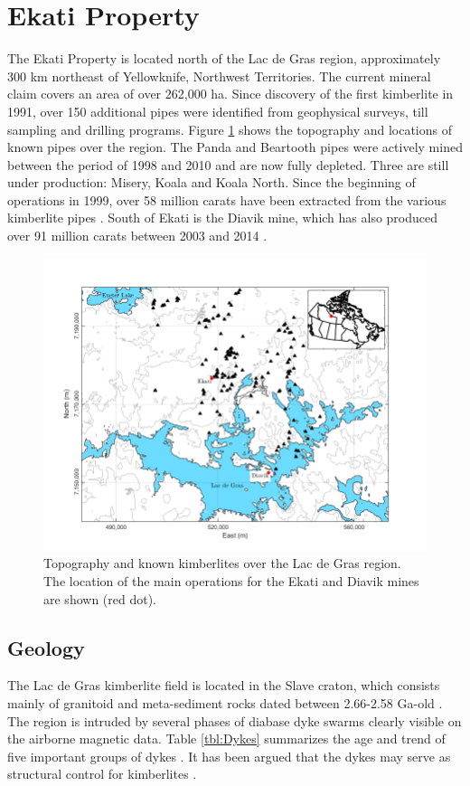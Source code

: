 \section{Ekati Property}
The Ekati Property is located north of the Lac de Gras region, approximately 300 km northeast of Yellowknife, Northwest Territories.
The current mineral claim covers an area of over 262,000 ha.
Since discovery of the first kimberlite in 1991, over 150 additional pipes were identified from geophysical surveys, till sampling and drilling programs.
Figure \ref{fig:Ekati_Location} shows the topography and locations of known pipes over the region.
The Panda and Beartooth pipes were actively mined between the period of 1998 and 2010 and are now fully depleted.
Three are still under production: Misery, Koala and Koala North.
Since the beginning of operations in 1999, over 58 million carats have been extracted from the various kimberlite pipes \cite[]{Carlson2015}.
South of Ekati is the Diavik mine, which has also produced over 91 million carats between 2003 and 2014 \cite[]{Yip2015}.

\begin{figure}[h!]
\includegraphics[scale=0.6]{Ekati_Location.png}
\caption{Topography and known kimberlites over the Lac de Gras region. The location of the main operations for the Ekati and Diavik mines are shown (red dot).}
\label{fig:Ekati_Location}
\end{figure}

\subsection{Geology}
The Lac de Gras kimberlite field is located in the Slave craton,  which consists mainly of granitoid and meta-sediment rocks dated between 2.66-2.58 Ga-old \cite[]{Creaser2004}.
The region is intruded by several phases of diabase dyke swarms clearly visible on the airborne magnetic data.
Table \ref{tbl:Dykes} summarizes the age and trend of five important groups of dykes \cite[]{Buchan09}.
It has been argued that the dykes may serve as structural control for kimberlites \cite[]{Wright1999}.


